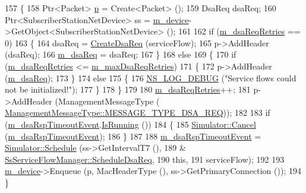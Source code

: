 \begin{DoxyCode}
157 \{
158   Ptr<Packet> \hyperlink{lte__link__budget_8m_ac9de518908a968428863f829398a4e62}{p} = Create<Packet> ();
159   DsaReq dsaReq;
160   Ptr<SubscriberStationNetDevice> ss = \hyperlink{classns3_1_1SsServiceFlowManager_a8b8a4279e4e039ac2eaeb8d051792441}{m\_device}->GetObject<SubscriberStationNetDevice> ();
161 
162   \textcolor{keywordflow}{if} (\hyperlink{classns3_1_1SsServiceFlowManager_a34c992ad355e2127c4377a62543208d8}{m\_dsaReqRetries} == 0)
163     \{
164       dsaReq = \hyperlink{classns3_1_1SsServiceFlowManager_a7adde8a20398dd4602777ca8ff64a4e9}{CreateDsaReq} (serviceFlow);
165       p->AddHeader (dsaReq);
166       \hyperlink{classns3_1_1SsServiceFlowManager_aa3b7c70eaaf1c7aa9cf5776b6292d2e1}{m\_dsaReq} = dsaReq;
167     \}
168   \textcolor{keywordflow}{else}
169     \{
170       \textcolor{keywordflow}{if} (\hyperlink{classns3_1_1SsServiceFlowManager_a34c992ad355e2127c4377a62543208d8}{m\_dsaReqRetries} <= \hyperlink{classns3_1_1SsServiceFlowManager_aafa53d5538ec0c8d45d54f24c0242081}{m\_maxDsaReqRetries})
171         \{
172           p->AddHeader (\hyperlink{classns3_1_1SsServiceFlowManager_aa3b7c70eaaf1c7aa9cf5776b6292d2e1}{m\_dsaReq});
173         \}
174       \textcolor{keywordflow}{else}
175         \{
176           \hyperlink{group__logging_ga413f1886406d49f59a6a0a89b77b4d0a}{NS\_LOG\_DEBUG} (\textcolor{stringliteral}{"Service flows could not be initialized!"});
177         \}
178     \}
179 
180   \hyperlink{classns3_1_1SsServiceFlowManager_a34c992ad355e2127c4377a62543208d8}{m\_dsaReqRetries}++;
181   p->AddHeader (ManagementMessageType (
      \hyperlink{classns3_1_1ManagementMessageType_a0e0c7a1e263538f0379d1bdb015abe3da41f2a4c34e30fc87da1d91ee4d4a063b}{ManagementMessageType::MESSAGE\_TYPE\_DSA\_REQ}));
182 
183   \textcolor{keywordflow}{if} (\hyperlink{classns3_1_1SsServiceFlowManager_a5ce17f5d3244434478627449f2e8b069}{m\_dsaRspTimeoutEvent}.\hyperlink{classns3_1_1EventId_aabf8476d1a080c199ea0c6aa9ccea372}{IsRunning} ())
184     \{
185       \hyperlink{classns3_1_1Simulator_a1b903a62d6117ef28f7ba3c6500689bf}{Simulator::Cancel} (\hyperlink{classns3_1_1SsServiceFlowManager_a5ce17f5d3244434478627449f2e8b069}{m\_dsaRspTimeoutEvent});
186     \}
187 
188   \hyperlink{classns3_1_1SsServiceFlowManager_a5ce17f5d3244434478627449f2e8b069}{m\_dsaRspTimeoutEvent} = \hyperlink{classns3_1_1Simulator_a671882c894a08af4a5e91181bf1eec13}{Simulator::Schedule} (ss->GetIntervalT7 (),
189                                               &
      \hyperlink{classns3_1_1SsServiceFlowManager_a052a9d96dea7f79a7408d19a9a20b875}{SsServiceFlowManager::ScheduleDsaReq},
190                                               \textcolor{keyword}{this},
191                                               serviceFlow);
192 
193   \hyperlink{classns3_1_1SsServiceFlowManager_a8b8a4279e4e039ac2eaeb8d051792441}{m\_device}->Enqueue (p, MacHeaderType (), ss->GetPrimaryConnection ());
194 \}
\end{DoxyCode}


